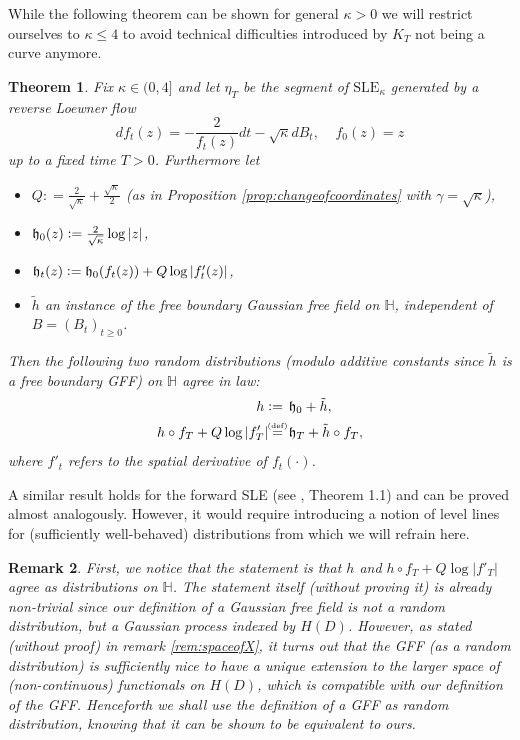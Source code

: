 \documentclass[11pt,reqno]{amsart}
\numberwithin{equation}{section}
\newtheorem{thm}{Theorem}[section]
\newtheorem{rem}[thm]{Remark}
\newcommand{\eqbydef}{\mathrel{\stackrel{\hspace*{-3mm}\text{\tiny(def)}\hspace*{-3mm}}{=}}}
\newcommand{\deq}{\mathrel{\mathop:}=}
\newcommand{\fh}{{\frak h}}
\begin{document}
While the following theorem can be shown for general $\kappa>0$ we will restrict ourselves to $\kappa\leq 4$ to avoid technical difficulties introduced by $K_T$ not being a curve anymore.

\begin{thm}\label{thm:SLEresult}
	Fix $\kappa\in (0,4]$ and let $\eta_T$ be the segment of $\text{SLE}_\kappa$ generated by a reverse Loewner flow \begin{equation}\label{eq:defOfLoewnerFlow}
		df_t(z)=-\frac{2}{f_t(z)}dt-\sqrt\kappa dB_t, \;\;\;\; f_0(z)=z
	\end{equation}
	up to a fixed time $T>0$. Furthermore let \begin{itemize}
		\item $Q\deq\frac{2}{\sqrt\kappa}+\frac{\sqrt\kappa}{2}$ (as in Proposition \ref{prop:changeofcoordinates} with $\gamma=\sqrt\kappa$),
		\item $\fh_0(z)\deq\frac{2}{\sqrt\kappa}\log|z|$,
		\item $\fh_t(z)\deq\fh_0(f_t(z))+Q\log|f'_t(z)|$,
		\item $\tilde h$ an instance of the free boundary Gaussian free field on $\mathbb H$, independent of $B=(B_t)_{t\geq 0}$.
	\end{itemize}
	Then the following two random distributions (modulo additive constants since $\tilde h$ is a \emph{free boundary} GFF) on $\mathbb H$ agree in law:
	\begin{align*}
		h\deq & \hspace*{1.5mm}\fh_0+\tilde h,\\
		h\circ f_T+Q\log|f'_T|\eqbydef &\hspace*{1.5mm}\fh_T+\tilde h\circ f_T,
	\end{align*}
	where $f'_t$ refers to the spatial derivative of $f_t(\cdot)$.
\end{thm}
A similar result holds for the forward SLE (see \cite{She15}, Theorem 1.1) and can be proved almost analogously. However, it would require introducing a notion of level lines for (sufficiently well-behaved) distributions from which we will refrain here.
\begin{rem}
	First, we notice that the statement is that $h$ and $h\circ f_T+Q\log|f'_T|$ agree as distributions on $\mathbb H$. The statement itself (without proving it) is already non-trivial since our definition of a Gaussian free field is not a random distribution, but a Gaussian process indexed by $H(D)$. 
	However, as stated (without proof) in remark \ref{rem:spaceofX}, it turns out that the GFF (as a random distribution) is sufficiently nice to have a unique extension to the larger space of (non-continuous) functionals on $H(D)$, which is compatible with our definition of the GFF.
	Henceforth we shall use the definition of a GFF as random distribution, knowing that it can be shown to be equivalent to ours.
\end{rem}
\end{document}
